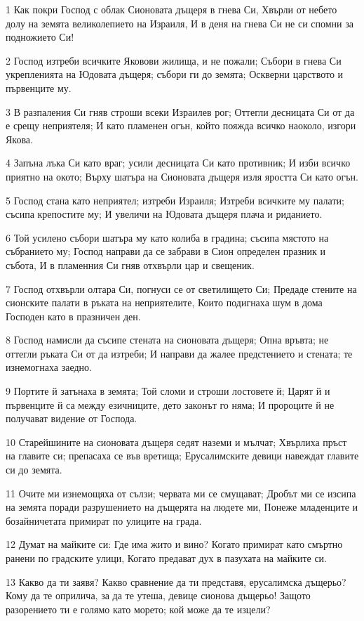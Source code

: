 \par 1 Как покри Господ с облак Сионовата дъщеря в гнева Си, Хвърли от небето долу на земята великолепието на Израиля, И в деня на гнева Си не си спомни за подножието Си!
\par 2 Господ изтреби всичките Яковови жилища, и не пожали; Събори в гнева Си укрепленията на Юдовата дъщеря; събори ги до земята; Оскверни царството и първенците му.
\par 3 В разпаления Си гняв строши всеки Израилев рог; Оттегли десницата Си от да е срещу неприятеля; И като пламенен огън, който пояжда всичко наоколо, изгори Якова.
\par 4 Запъна лъка Си като враг; усили десницата Си като противник; И изби всичко приятно на окото; Върху шатъра на Сионовата дъщеря изля яростта Си като огън.
\par 5 Господ стана като неприятел; изтреби Израиля; Изтреби всичките му палати; съсипа крепостите му; И увеличи на Юдовата дъщеря плача и риданието.
\par 6 Той усилено събори шатъра му като колиба в градина; съсипа мястото на събранието му; Господ направи да се забрави в Сион определен празник и събота, И в пламенния Си гняв отхвърли цар и свещеник.
\par 7 Господ отхвърли олтара Си, погнуси се от светилището Си; Предаде стените на сионските палати в ръката на неприятелите, Които подигнаха шум в дома Господен като в празничен ден.
\par 8 Господ намисли да съсипе стената на сионовата дъщеря; Опна връвта; не оттегли ръката Си от да изтреби; И направи да жалее предстението и стената; те изнемогнаха заедно.
\par 9 Портите й затънаха в земята; Той сломи и строши лостовете й; Царят й и първенците й са между езичниците, дето законът го няма; И пророците й не получават видение от Господа.
\par 10 Старейшините на сионовата дъщеря седят наземи и мълчат; Хвърлиха пръст на главите си; препасаха се във вретища; Ерусалимските девици навеждат главите си до земята.
\par 11 Очите ми изнемощяха от сълзи; червата ми се смущават; Дробът ми се изсипа на земята поради разрушението на дъщерята на людете ми, Понеже младенците и бозайничетата примират по улиците на града.
\par 12 Думат на майките си: Где има жито и вино? Когато примират като смъртно ранени по градските улици, Когато предават дух в пазухата на майките си.
\par 13 Какво да ти заявя? Какво сравнение да ти представя, ерусалимска дъщерьо? Кому да те оприлича, за да те утеша, девице сионова дъщерьо! Защото разорението ти е голямо като морето; кой може да те изцели?
